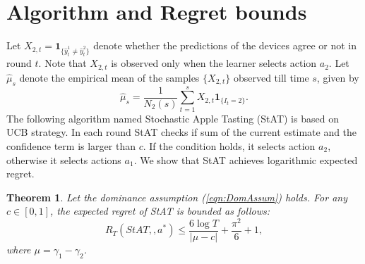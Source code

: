 \documentclass[draft, onecolumn, 12pt]{IEEEtran}
\newtheorem{thm}{Theorem}
\begin{document}
\section{Algorithm and Regret bounds}
Let $X_{2,t}=\boldsymbol{1}_{\{\hat{y}^1_t \neq \hat{y}^2_t\}}$ denote whether the predictions of the  devices agree or not in round $t$. Note that $X_{2,t}$ is observed only when the learner selects action $a_2$. Let $\hat{\mu}_s$ denote the empirical mean of the samples $\{X_{{2,t}}\}$ observed till time $s$, given by
\begin{equation}
\hat{\mu}_s= \frac{1}{N_2(s)}\sum_{t=1}^s X_{2,t}\boldsymbol{1}_{\{I_t=2\}}.
\end{equation}
The following algorithm named Stochastic Apple Tasting (StAT) is based on UCB strategy.  In each round StAT checks if sum of the current estimate and the confidence term is larger than $c$. If the condition holds, it selects action $a_2$, otherwise it selects actions $a_1$. We show that StAT achieves logarithmic expected regret. 

\begin{thm}
\label{thm:RegretStAT}
Let the dominance assumption (\ref{eqn:DomAssum}) holds. For any $c \in [0,1]$, the expected regret of StAT is bounded as follows:
\begin{equation}
R_T(StAT,,a^*)\leq \frac{6\log T}{|\mu-c|} + \frac{\pi^2}{6}+1,
\end{equation}
where $\mu= \gamma_1- \gamma_2$. 
\end{thm}
\end{document}
